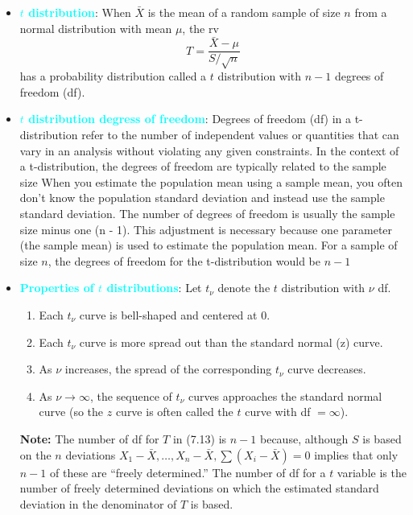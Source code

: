 \documentclass{report}
\begin{document}
\begin{itemize}
        \item \textbf{\textcolor{cyan}{$t$ distribution}}:
            When $\bar{X}$ is the mean of a random sample of size $n$ from a normal distribution with mean $\mu$, the rv
            \[
                T = \frac{\bar{X} - \mu}{S/\sqrt{n}} \tag{7.13}
            \]
            has a probability distribution called a $t$ distribution with $n - 1$ degrees of freedom (df).
        \item \textbf{\textcolor{cyan}{$t$ distribution degress of freedom}}:
            Degrees of freedom (df) in a t-distribution refer to the number of independent values or quantities that can vary in an analysis without violating any given constraints. In the context of a t-distribution, the degrees of freedom are typically related to the sample size
            \bigbreak \noindent 
            When you estimate the population mean using a sample mean, you often don't know the population standard deviation and instead use the sample standard deviation. The number of degrees of freedom is usually the sample size minus one (n - 1). This adjustment is necessary because one parameter (the sample mean) is used to estimate the population mean.
            \bigbreak \noindent 
            For a sample of size $n$, the degrees of freedom for the t-distribution would be $n-1$
        \item \textbf{\textcolor{cyan}{Properties of $t$ distributions}}:
            Let $t_{\nu}$ denote the $t$ distribution with $\nu$ df.
            \begin{enumerate}
                \item Each $t_{\nu}$ curve is bell-shaped and centered at 0.
                \item Each $t_{\nu}$ curve is more spread out than the standard normal (z) curve.
                \item As $\nu$ increases, the spread of the corresponding $t_{\nu}$ curve decreases.
                \item As $\nu \to \infty$, the sequence of $t_{\nu}$ curves approaches the standard normal curve (so the $z$ curve is often called the $t$ curve with df $= \infty$).
            \end{enumerate}
            \bigbreak \noindent 
            \bigbreak \noindent 
            \textbf{Note:} The number of df for $T$ in (7.13) is $n - 1$ because, although $S$ is based on the $n$ deviations $X_1 - \bar{X}, \ldots, X_n - \bar{X}, \sum(X_i - \bar{X}) = 0$ implies that only $n - 1$ of these are ``freely determined.'' The number of df for a $t$ variable is the number of freely determined deviations on which the estimated standard deviation in the denominator of $T$ is based.

\end{itemize}
\end{document}
